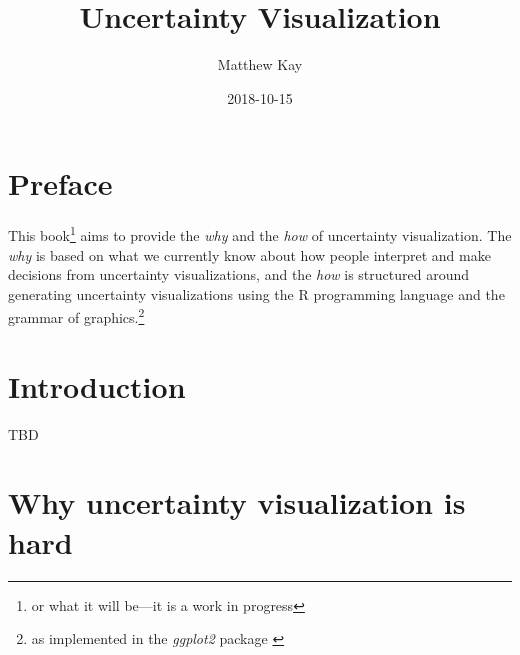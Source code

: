 \documentclass[]{book}
\title{Uncertainty Visualization}
\author{Matthew Kay}
\date{2018-10-15}
\let\rmarkdownfootnote\footnote%
\def\footnote{\protect\rmarkdownfootnote}
\theoremstyle{definition}
\theoremstyle{definition}
\theoremstyle{definition}
\theoremstyle{remark}
\begin{document}
\maketitle

{
\setcounter{tocdepth}{1}
\tableofcontents
}
\hypertarget{preface}{%
\chapter*{Preface}\label{preface}}

This book\footnote{or what it will be---it is a work in progress} aims
to provide the \emph{why} and the \emph{how} of uncertainty
visualization. The \emph{why} is based on what we currently know about
how people interpret and make decisions from uncertainty visualizations,
and the \emph{how} is structured around generating uncertainty
visualizations using the R programming language and the grammar of
graphics.\footnote{as implemented in the \emph{ggplot2} package
  \citep{R-ggplot2}}

\hypertarget{ch-intro}{%
\chapter{Introduction}\label{ch-intro}}

TBD

\hypertarget{ch-why-hard}{%
\chapter{Why uncertainty visualization is hard}\label{ch-why-hard}}
\end{document}
